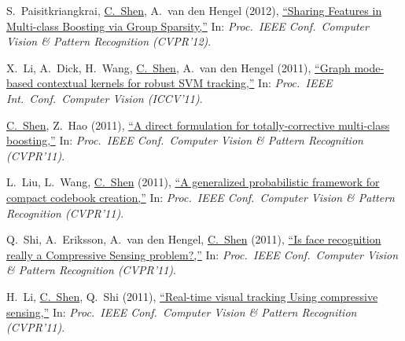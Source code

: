 \documentclass[9pt, a4paper]{article}
\newcommand{\years}[1]{\marginnote{\scriptsize #1}}
\def\highlight{\uline}
\begin{document}
\medskip

\years{2012} S.~Paisitkriangkrai, \highlight{C.~Shen}, A.~van den Hengel (2012),
\href{http://www.google.com/search?lr=&ie=UTF-8&oe=UTF-8&q=Sharing+Features+in+Multi-class+Boosting+via+Group+Sparsity+Sakrapee+Paisitkriangkrai%2C+Chunhua+Shen%2C+Anton+van+den+Hengel}{``Sharing Features in Multi-class Boosting via Group Sparsity,{}''}
In: \emph{Proc.\ IEEE Conf.\  Computer Vision \& Pattern Recognition (CVPR'12)}.

\medskip

\years{2011} X.~Li, A.~Dick, H.~Wang, \highlight{C.~Shen}, A.~van den Hengel (2011),
\href{http://www.google.com/search?lr=&ie=UTF-8&oe=UTF-8&q=Graph+mode-based+contextual+kernels+for+robust+SVM+tracking+Xi+Li%2C+Anthony+Dick%2C+Hanzi+Wang%2C+Chunhua+Shen%2C+Anton+van+den+Hengel}{``Graph mode-based contextual kernels for robust {SVM} tracking,{}''}
In: \emph{Proc.\ IEEE Int.\ Conf.\  Computer Vision (ICCV'11)}.

\medskip

\years{2011} \highlight{C.~Shen}, Z.~Hao (2011),
\href{http://www.google.com/search?lr=&ie=UTF-8&oe=UTF-8&q=A+direct+formulation+for+totally-corrective+multi-class+boosting+Chunhua+Shen%2C+Zhihui+Hao}{``A direct formulation for totally-corrective multi-class boosting,{}''}
In: \emph{Proc.\ IEEE Conf.\  Computer Vision \& Pattern Recognition (CVPR'11)}.

\medskip

\years{2011} L.~Liu, L.~Wang, \highlight{C.~Shen} (2011),
\href{http://www.google.com/search?lr=&ie=UTF-8&oe=UTF-8&q=A+generalized+probabilistic+framework+for+compact+codebook+creation+Lingqiao+Liu%2C+Lei+Wang%2C+Chunhua+Shen}{``A generalized probabilistic framework for compact codebook creation,{}''}
In: \emph{Proc.\ IEEE Conf.\  Computer Vision \& Pattern Recognition (CVPR'11)}.

\medskip

\years{2011} Q.~Shi, A.~Eriksson, A.~van den Hengel, \highlight{C.~Shen} (2011),
\href{http://www.google.com/search?lr=&ie=UTF-8&oe=UTF-8&q=Is+face+recognition+really+a+Compressive+Sensing+problem%3F+Qinfeng+Shi%2C+Anders+Eriksson%2C+Anton+van+den+Hengel%2C+Chunhua+Shen}{``Is face recognition really a Compressive Sensing problem?,{}''}
In: \emph{Proc.\ IEEE Conf.\  Computer Vision \& Pattern Recognition (CVPR'11)}.

\medskip

\years{2011} H.~Li, \highlight{C.~Shen}, Q.~Shi (2011),
\href{http://www.google.com/search?lr=&ie=UTF-8&oe=UTF-8&q=Real-time+visual+tracking+Using+compressive+sensing+Hanxi+Li%2C+Chunhua+Shen%2C+Qinfeng+Shi}{``Real-time visual tracking Using compressive sensing,{}''}
In: \emph{Proc.\ IEEE Conf.\  Computer Vision \& Pattern Recognition (CVPR'11)}.
\end{document}

